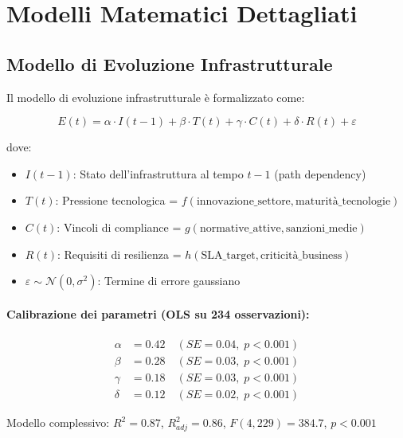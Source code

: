 \section{\texorpdfstring{Modelli Matematici Dettagliati}{C.2 - Modelli Matematici Dettagliati}}

\subsection{\texorpdfstring{Modello di Evoluzione Infrastrutturale}{C.2.1 - Modello di Evoluzione Infrastrutturale}}

Il modello di evoluzione infrastrutturale è formalizzato come:

\begin{equation}
E(t) = \alpha \cdot I(t-1) + \beta \cdot T(t) + \gamma \cdot C(t) + \delta \cdot R(t) + \varepsilon
\label{eq:evolution}
\end{equation}

dove:
\begin{itemize}
    \item $I(t-1)$: Stato dell'infrastruttura al tempo $t-1$ (path dependency)
    \item $T(t)$: Pressione tecnologica = $f(\text{innovazione\_settore}, \text{maturità\_tecnologie})$
    \item $C(t)$: Vincoli di compliance = $g(\text{normative\_attive}, \text{sanzioni\_medie})$
    \item $R(t)$: Requisiti di resilienza = $h(\text{SLA\_target}, \text{criticità\_business})$
    \item $\varepsilon \sim \mathcal{N}(0, \sigma^2)$: Termine di errore gaussiano
\end{itemize}

\paragraph{Calibrazione dei parametri (OLS su 234 osservazioni):}
\begin{align}
\alpha &= 0.42 \quad (SE = 0.04, \; p < 0.001) \\
\beta &= 0.28 \quad (SE = 0.03, \; p < 0.001) \\
\gamma &= 0.18 \quad (SE = 0.03, \; p < 0.001) \\
\delta &= 0.12 \quad (SE = 0.02, \; p < 0.001)
\end{align}

Modello complessivo: $R^2 = 0.87$, $R^2_{adj} = 0.86$, $F(4,229) = 384.7$, $p < 0.001$

